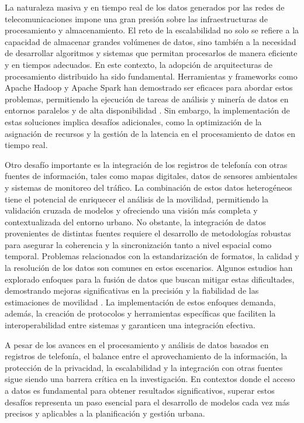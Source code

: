 La naturaleza masiva y en tiempo real de los datos generados por las redes de telecomunicaciones impone una gran presión sobre las infraestructuras de procesamiento y almacenamiento. El reto de la escalabilidad no solo se refiere a la capacidad de almacenar grandes volúmenes de datos, sino también a la necesidad de desarrollar algoritmos y sistemas que permitan procesarlos de manera eficiente y en tiempos adecuados. En este contexto, la adopción de arquitecturas de procesamiento distribuido ha sido fundamental. Herramientas y frameworks como Apache Hadoop y Apache Spark han demostrado ser eficaces para abordar estos problemas, permitiendo la ejecución de tareas de análisis y minería de datos en entornos paralelos y de alta disponibilidad \cite{zaharia2016apache}. Sin embargo, la implementación de estas soluciones implica desafíos adicionales, como la optimización de la asignación de recursos y la gestión de la latencia en el procesamiento de datos en tiempo real.

Otro desafío importante es la integración de los registros de telefonía con otras fuentes de información, tales como mapas digitales, datos de sensores ambientales y sistemas de monitoreo del tráfico. La combinación de estos datos heterogéneos tiene el potencial de enriquecer el análisis de la movilidad, permitiendo la validación cruzada de modelos y ofreciendo una visión más completa y contextualizada del entorno urbano. No obstante, la integración de datos provenientes de distintas fuentes requiere el desarrollo de metodologías robustas para asegurar la coherencia y la sincronización tanto a nivel espacial como temporal. Problemas relacionados con la estandarización de formatos, la calidad y la resolución de los datos son comunes en estos escenarios. Algunos estudios han explorado enfoques para la fusión de datos que buscan mitigar estas dificultades, demostrando mejoras significativas en la precisión y la fiabilidad de las estimaciones de movilidad \cite{batty2012smart}. La implementación de estos enfoques demanda, además, la creación de protocolos y herramientas específicas que faciliten la interoperabilidad entre sistemas y garanticen una integración efectiva.

A pesar de los avances en el procesamiento y análisis de datos basados en registros de telefonía, el balance entre el aprovechamiento de la información, la protección de la privacidad, la escalabilidad y la integración con otras fuentes sigue siendo una barrera crítica en la investigación. En contextos donde el acceso a datos es fundamental para obtener resultados significativos, superar estos desafíos representa un paso esencial para el desarrollo de modelos cada vez más precisos y aplicables a la planificación y gestión urbana.

